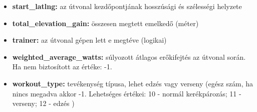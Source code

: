 \begin{itemize}
	\item \textbf{start\_latlng:} az útvonal kezdőpontjának hosszúsági és szélességi helyzete
	\item \textbf{total\_elevation\_gain:} összesen megtett emelkedő (méter)
	\item \textbf{trainer:} az útvonal gépen lett e megtéve (logikai)
	\item \textbf{weighted\_average\_watts:} súlyozott átlagos erőkifejtés az útvonal során. Ha  nem biztosított az értéke: -1.
	\item \textbf{workout\_type:} tevékenység típusa, lehet edzés vagy verseny (egész szám, ha nincs megadva akkor -1. Lehetséges értékei: 10 - normál kerékpározás; 11 - verseny; 12 - edzés )
\end{itemize}










